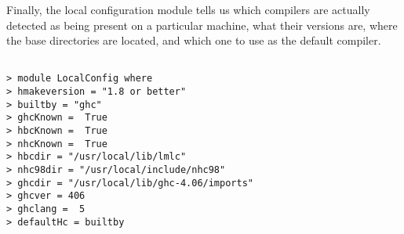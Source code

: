 \documentclass[a4paper]{article}
\begin{document}
Finally, the local configuration module tells us which compilers
are actually detected as being present on a particular machine,
what their versions are, where the base directories are located,
and which one to use as the default compiler.

\begin{verbatim}

> module LocalConfig where
> hmakeversion = "1.8 or better"
> builtby = "ghc"
> ghcKnown =  True
> hbcKnown =  True
> nhcKnown =  True
> hbcdir = "/usr/local/lib/lmlc"
> nhc98dir = "/usr/local/include/nhc98"
> ghcdir = "/usr/local/lib/ghc-4.06/imports"
> ghcver = 406
> ghclang =  5
> defaultHc = builtby

\end{verbatim}
\end{document}
